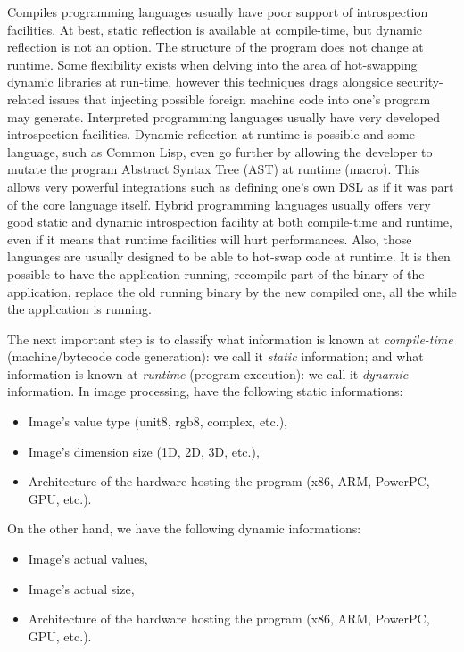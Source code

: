 Compiles programming languages usually have poor support of introspection facilities. At best, static reflection is
available at compile-time, but dynamic reflection is not an option. The structure of the program does not change at
runtime. Some flexibility exists when delving into the area of hot-swapping dynamic libraries at run-time, however this
techniques drags alongside security-related issues that injecting possible foreign machine code into one's program may
generate.
Interpreted programming languages usually have very developed introspection facilities. Dynamic reflection at
runtime is possible and some language, such as Common Lisp, even go further by allowing the developer to mutate the
program Abstract Syntax Tree (AST) at runtime (macro). This allows very powerful integrations such as defining one's own
DSL as if it was part of the core language itself.
Hybrid programming languages usually offers very good static and dynamic introspection facility at both compile-time and
runtime, even if it means that runtime facilities will hurt performances. Also, those languages are usually designed to
be able to hot-swap code at runtime. It is then possible to have the application running, recompile part of the binary
of the application, replace the old running binary by the new compiled one, all the while the application is running.

The next important step is to classify what information is known at \emph{compile-time} (machine/bytecode code
generation): we call it \emph{static} information; and what information is known at \emph{runtime} (program execution):
we call it \emph{dynamic} information. In image processing, have the following static informations:
\begin{itemize}
  \item Image's value type (unit8, rgb8, complex, etc.),
  \item Image's dimension size (1D, 2D, 3D, etc.),
  \item Architecture of the hardware hosting the program (x86, ARM, PowerPC, GPU, etc.).
\end{itemize}
On the other hand, we have the following dynamic informations:
\begin{itemize}
  \item Image's actual values,
  \item Image's actual size,
  \item Architecture of the hardware hosting the program (x86, ARM, PowerPC, GPU, etc.).
\end{itemize}

